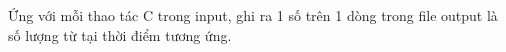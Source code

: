 Ứng với mỗi thao tác C trong input, ghi ra 1 số trên 1 dòng trong file output là số lượng từ tại thời điểm tương ứng.

\